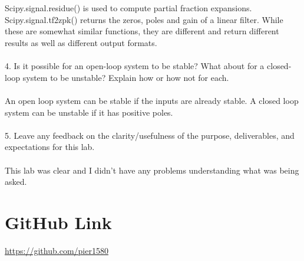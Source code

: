\\ \\
Scipy.signal.residue() is used to compute partial fraction expansions.  Scipy.signal.tf2zpk() returns the zeros, poles and gain of a linear filter.  While these are somewhat similar functions, they are different and return different results as well as different output formats.
\\ \\
4. Is it possible for an open-loop system to be stable? What about for a closed-loop system to be unstable? Explain how or how not for each.
\\ \\
An open loop system can be stable if the inputs are already stable.  A closed loop system can be unstable if it has positive poles.
\\ \\
5. Leave any feedback on the clarity/usefulness of the purpose, deliverables, and expectations for this lab.
\\ \\
This lab was clear and I didn't have any problems understanding what was being asked.

\section{GitHub Link}
\url{https://github.com/pier1580}

%




